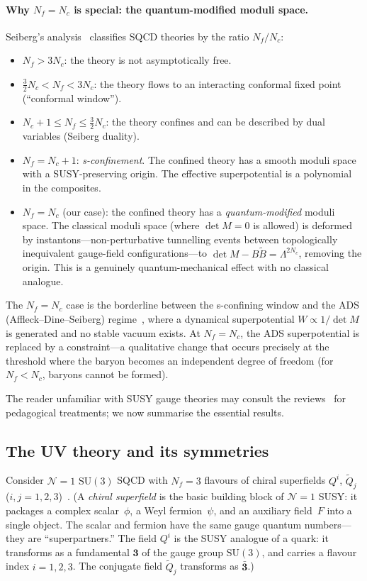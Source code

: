 \documentclass[12pt,a4paper]{article}
\newcommand{\SU}{\mathrm{SU}}
\newcommand{\Nf}{N_f}
\newcommand{\Nc}{N_c}
\begin{document}
\paragraph{Why $\Nf = \Nc$ is special: the quantum-modified moduli space.}
Seiberg's analysis~\cite{Seiberg:1994bz,Intriligator:1995au}
classifies SQCD theories by the ratio $\Nf/\Nc$:
\begin{itemize}
  \item $\Nf > 3\Nc$: the theory is not asymptotically free.
  \item $\frac{3}{2}\Nc < \Nf < 3\Nc$: the theory flows to
    an interacting conformal fixed point (``conformal window'').
  \item $\Nc + 1 \leq \Nf \leq \frac{3}{2}\Nc$: the theory confines
    and can be described by dual variables (Seiberg duality).
  \item $\Nf = \Nc + 1$: \emph{s-confinement}. The confined theory
    has a smooth moduli space with a SUSY-preserving origin.
    The effective superpotential is a polynomial in the composites.
  \item $\Nf = \Nc$ (our case): the confined theory has a
    \emph{quantum-modified} moduli space. The classical moduli space
    (where $\det M = 0$ is allowed) is deformed by
    instantons---non-perturbative tunnelling events between
    topologically inequivalent gauge-field configurations---to
    $\det M - B\tilde B = \Lambda^{2\Nc}$, removing the origin.
    This is a genuinely quantum-mechanical effect with no classical
    analogue.
\end{itemize}
The $\Nf = \Nc$ case is the borderline between the s-confining
window and the ADS (Affleck--Dine--Seiberg)
regime~\cite{AffleckDineSeiberg:1984}, where a
dynamical superpotential $W \propto 1/\det M$ is generated and
no stable vacuum exists.  At $\Nf = \Nc$, the ADS superpotential
is replaced by a constraint---a qualitative change that occurs
precisely at the threshold where the baryon becomes an independent
degree of freedom (for $\Nf < \Nc$, baryons cannot be formed).

The reader unfamiliar with SUSY gauge theories may consult
the reviews~\cite{Intriligator:1995au,Seiberg:1994bz} for
pedagogical treatments; we now summarise the essential results.

\subsection{The UV theory and its symmetries}

Consider $\mathcal{N}=1$ $\SU(3)$ SQCD with $\Nf = 3$ flavours of
chiral superfields $Q^i$, $\tilde{Q}_j$
($i,j = 1,2,3$)~\cite{Seiberg:1994bz,Intriligator:1995au}.
(A \emph{chiral superfield} is the basic building block of
$\mathcal{N}=1$ SUSY: it packages a complex scalar~$\phi$, a Weyl
fermion~$\psi$, and an auxiliary field~$F$ into a single object.
The scalar and fermion have the same gauge quantum numbers---they
are ``superpartners.'' The field $Q^i$ is the SUSY analogue of
a quark: it transforms as a fundamental $\mathbf{3}$ of the gauge
group $\SU(3)$, and carries a flavour index $i = 1,2,3$. The
conjugate field $\tilde Q_j$ transforms as $\bar{\mathbf{3}}$.)
\end{document}
